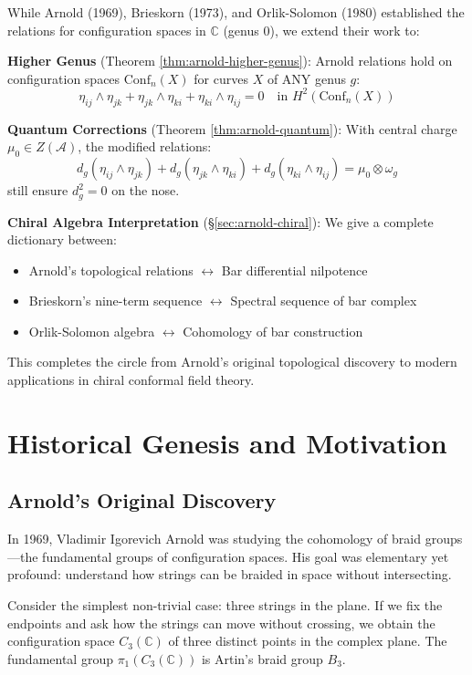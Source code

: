 \begin{remark}
While Arnold (1969), Brieskorn (1973), and Orlik-Solomon (1980) established the relations 
for configuration spaces in $\mathbb{C}$ (genus 0), we extend their work to:

\textbf{Higher Genus} (Theorem \ref{thm:arnold-higher-genus}):
Arnold relations hold on configuration spaces $\text{Conf}_n(X)$ for curves $X$ of ANY genus $g$:
$$\eta_{ij} \wedge \eta_{jk} + \eta_{jk} \wedge \eta_{ki} + \eta_{ki} \wedge \eta_{ij} = 0 
\quad \text{in } H^2(\text{Conf}_n(X))$$

\textbf{Quantum Corrections} (Theorem \ref{thm:arnold-quantum}):
With central charge $\mu_0 \in Z(\mathcal{A})$, the modified relations:
$$d_g(\eta_{ij} \wedge \eta_{jk}) + d_g(\eta_{jk} \wedge \eta_{ki}) 
+ d_g(\eta_{ki} \wedge \eta_{ij}) = \mu_0 \otimes \omega_g$$
still ensure $d_g^2 = 0$ on the nose.

\textbf{Chiral Algebra Interpretation} (§\ref{sec:arnold-chiral}):
We give a complete dictionary between:
\begin{itemize}
\item Arnold's topological relations $\leftrightarrow$ Bar differential nilpotence
\item Brieskorn's nine-term sequence $\leftrightarrow$ Spectral sequence of bar complex
\item Orlik-Solomon algebra $\leftrightarrow$ Cohomology of bar construction
\end{itemize}

This completes the circle from Arnold's original topological discovery to modern 
applications in chiral conformal field theory.
\end{remark}

\section{Historical Genesis and Motivation}

\subsection{Arnold's Original Discovery}

In 1969, Vladimir Igorevich Arnold was studying the cohomology of braid groups—the fundamental groups of configuration spaces. His goal was elementary yet profound: understand how strings can be braided in space without intersecting.

Consider the simplest non-trivial case: three strings in the plane. If we fix the endpoints and ask how the strings can move without crossing, we obtain the configuration space $C_3(\mathbb{C})$ of three distinct points in the complex plane. The fundamental group $\pi_1(C_3(\mathbb{C}))$ is Artin's braid group $B_3$.

